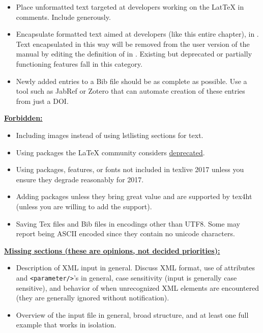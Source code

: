 \begin{itemize}
\begin{itemize}
\end{itemize}
\item{Place unformatted text targeted at developers working on the LatTeX in comments.  Include generously.}
\item{Encapsulate formatted text aimed at developers (like this entire chapter), in \ilatex{\\dev\{\}}.  Text encapsulated in this way will be removed from the user version of the manual by editing the definition of \ilatex{\\dev\{\}} in .  Existing but deprecated or partially functioning features fall in this category.}
\item Newly added entries to a Bib file should be as complete as possible. Use a tool such as JabRef or Zotero that can automate creation of these entries from just a DOI.
\end{itemize}

\textbf{\underline{Forbidden:}}
\begin{itemize}
\item Including images instead of using lstlisting sections for text.
\item Using packages the LaTeX community considers \href{https://latex.org/forum/viewtopic.php?f=37&t=6637}{deprecated}.
\item Using packages, features, or fonts not included in texlive 2017 unless you ensure they degrade reasonably for 2017.
\item Adding packages unless they bring great value and are supported by tex4ht (unless you are willing to add the support).
\item Saving Tex files and Bib files in encodings other than UTF8. Some may report being ASCII encoded since they contain no unicode characters.
\end{itemize}


\textbf{\underline{Missing sections (these are opinions, not decided priorities):}}
\begin{itemize}
  \item{Description of XML input in general.  Discuss XML format, use of attributes and \texttt{<parameter/>}'s in general, case sensitivity (input is generally case sensitive), and behavior of \qmcpack when unrecognized XML elements are encountered (they are generally ignored without notification).}
  \item{Overview of the input file in general, broad structure, and at least one full example that works in isolation.}
\end{itemize}


